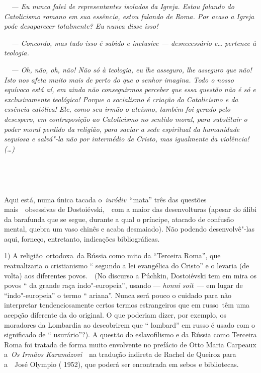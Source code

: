 \emph{~~--- Eu nunca falei de representantes isolados da Igreja. Estou
falando do Catolicismo romano em sua essência, estou falando de Roma.
Por acaso a Igreja pode desaparecer totalmente? Eu nunca disse isso!}

\emph{~~--- Concordo, mas tudo isso é sabido e inclusive ---
desnecessário e\ldots{} pertence à teologia.}

\emph{~~--- Oh, não, oh, não! Não só à teologia, eu lhe asseguro, lhe
asseguro que não! Isto nos afeta muito mais de perto do que o senhor
imagina. Todo o nosso equívoco está aí, em ainda não conseguirmos
perceber que essa questão não é só e exclusivamente teológica! Porque o
socialismo é criação do Catolicismo e da essência católica! Ele, como
seu irmão o ateísmo, também foi gerado pelo desespero, em contraposição
ao Catolicismo no sentido moral, para substituir o poder moral perdido
da religião, para saciar a sede espiritual da humanidade sequiosa e
salvá"-la não por intermédio de Cristo, mas igualmente da violência!
(\ldots{})}

\emph{~}

\emph{~}

Aqui está, numa única tacada o~\emph{iuródiv}~``mata'' três das questões
mais~~obsessivas de Dostoiévski,~~com a maior das desenvolturas (apesar
do álibi da barafunda que se segue, durante a qual o príncipe, atacado
de confusão mental, quebra um vaso chinês e acaba desmaiado). Não
podendo desenvolvê"-las aqui, forneço, entretanto, indicações
bibliográficas.

1) A religião~ortodoxa~da Rússia como mito da ``Terceira Roma'', que
reatualizaria o cristianismo `` segundo a lei evangélica do Cristo'' e o
levaria (de volta) aos diferentes povos.~~(No discurso a Púchkin,
Dostoiévski tem em mira os povos `` da grande raça indo"-europeia'',
usando --- \emph{honni soit}~--- em lugar de ``indo"-europeia'' o termo ``
ariana''. Nunca será pouco o cuidado para não interpretar
tendenciosamente certos termos estrangeiros que em russo~têm uma acepção
diferente da do original. O que poderiam dizer, por exemplo, os
moradores da Lombardia ao descobrirem que `` lombard'' em russo é usado
com o significado de `` usurário''?). A questão do eslavofilismo e da
Rússia como Terceira Roma foi tratada de forma muito envolvente no
prefácio de Otto Maria Carpeaux a~\emph{Os Irmãos Karamázovi}~~na
tradução indireta de Rachel de Queiroz para a~~José Olympio ( 1952), que
poderá ser encontrada em sebos e bibliotecas.

~


